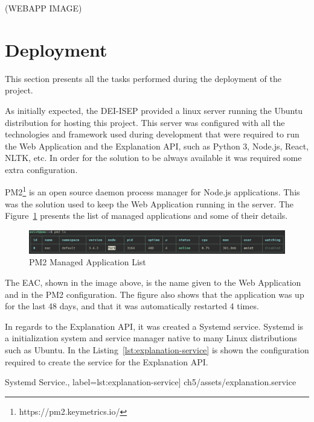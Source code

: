 (WEBAPP IMAGE) %

\section{Deployment}

This section presents all the tasks performed during the deployment of the project.

As initially expected, the DEI-ISEP provided a linux server running the Ubuntu distribution for hosting this project.
This server was configured with all the technologies and framework used during development that were required to run the Web Application and the Explanation API, such as Python 3, Node.js, React, NLTK, etc.
In order for the solution to be always available it was required some extra configuration.

PM2\footnote{https://pm2.keymetrics.io/} is an open source daemon process manager for Node.js applications.
This was the solution used to keep the Web Application running in the server.
The Figure~\ref{fig:pm2} presents the list of managed applications and some of their details.

\begin{figure}[H]
\centering
\includegraphics[width=\textwidth,keepaspectratio]{ch5/assets/pm2ls.png}
\caption[PM2 Managed Application List]{PM2 Managed Application List}
\label{fig:pm2}
\end{figure}

The EAC, shown in the image above, is the name given to the Web Application and in the PM2 configuration.
The figure also shows that the application was up for the last 48 days, and that it was automatically restarted 4 times.

In regards to the Explanation API, it was created a Systemd service.
Systemd is a initialization system and service manager native to many Linux distributions such as Ubuntu.
In the Listing~\ref{lst:explanation-service} is shown the configuration required to create the service for the Explanation API.

\begin{center}
\begin{minipage}{0.95\linewidth}
 Systemd Service.,
label=lst:explanation-service]
{ch5/assets/explanation.service}
\end{minipage}
\end{center}

